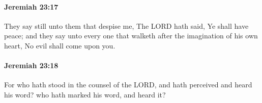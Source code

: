 		\paragraph{Jeremiah 23:17} %
			\label{JEREMIAH-23-17}

			They say still unto them that despise me, The LORD hath said, Ye shall have peace; and they say unto every one that walketh after the imagination of his own heart, No evil shall come upon you.


		\paragraph{Jeremiah 23:18} %
			\label{JEREMIAH-23-18}

			For who hath stood in the counsel of the LORD, and hath perceived and heard his word? who hath marked his word, and heard it?


